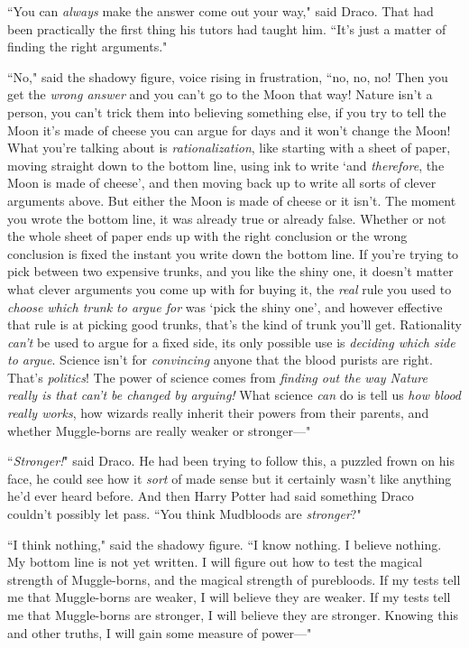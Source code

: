 ``You can \emph{always} make the answer come out your way," said Draco. That had been practically the first thing his tutors had taught him. ``It's just a matter of finding the right arguments."

``No," said the shadowy figure, voice rising in frustration, ``no, no, no! Then you get the \emph{wrong answer} and you can't go to the Moon that way! Nature isn't a person, you can't trick them into believing something else, if you try to tell the Moon it's made of cheese you can argue for days and it won't change the Moon! What you're talking about is \emph{rationalization}, like starting with a sheet of paper, moving straight down to the bottom line, using ink to write `and \emph{therefore}, the Moon is made of cheese', and then moving back up to write all sorts of clever arguments above. But either the Moon is made of cheese or it isn't. The moment you wrote the bottom line, it was already true or already false. Whether or not the whole sheet of paper ends up with the right conclusion or the wrong conclusion is fixed the instant you write down the bottom line. If you're trying to pick between two expensive trunks, and you like the shiny one, it doesn't matter what clever arguments you come up with for buying it, the \emph{real} rule you used to \emph{choose which trunk to argue for} was `pick the shiny one', and however effective that rule is at picking good trunks, that's the kind of trunk you'll get. Rationality \emph{can't} be used to argue for a fixed side, its only possible use is \emph{deciding which side to argue}. Science isn't for \emph{convincing} anyone that the blood purists are right. That's \emph{politics}! The power of science comes from \emph{finding out the way Nature really is that can't be changed by arguing!} What science \emph{can} do is tell us \emph{how blood really works}, how wizards really inherit their powers from their parents, and whether Muggle-borns are really weaker or stronger---"

``\emph{Stronger!}" said Draco. He had been trying to follow this, a puzzled frown on his face, he could see how it \emph{sort} of made sense but it certainly wasn't like anything he'd ever heard before. And then Harry Potter had said something Draco couldn't possibly let pass. ``You think Mudbloods are \emph{stronger}?"

``I think nothing," said the shadowy figure. ``I know nothing. I believe nothing. My bottom line is not yet written. I will figure out how to test the magical strength of Muggle-borns, and the magical strength of purebloods. If my tests tell me that Muggle-borns are weaker, I will believe they are weaker. If my tests tell me that Muggle-borns are stronger, I will believe they are stronger. Knowing this and other truths, I will gain some measure of power---"

